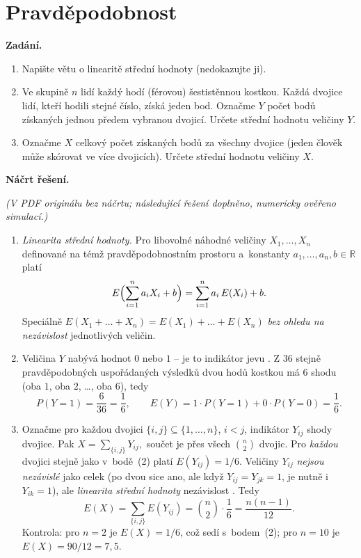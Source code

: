 \section{Pravděpodobnost}

\noindent\textbf{Zadání.}\par
\begin{enumerate}
  \item Napište větu o linearitě střední hodnoty (nedokazujte ji).
  \item Ve skupině $n$ lidí každý hodí (férovou) šestistěnnou kostkou. Každá dvojice lidí,
    kteří hodili stejné číslo, získá jeden bod. Označme $Y$ počet bodů získaných jednou
    předem vybranou dvojicí. Určete střední hodnotu veličiny $Y$.
  \item Označme $X$ celkový počet získaných bodů za všechny dvojice (jeden člověk může
    skórovat ve více dvojicích). Určete střední hodnotu veličiny $X$.
\end{enumerate}

\medskip
\noindent\textbf{Náčrt řešení.}\par
\textit{(V PDF originálu bez náčrtu; následující řešení doplněno, numericky ověřeno simulací.)}

\begin{enumerate}
  \item \emph{Linearita střední hodnoty.} Pro libovolné náhodné veličiny $X_1,\dots,X_n$ definované na témž pravděpodobnostním prostoru a~konstanty $a_1,\dots,a_n,b\in\mathbb{R}$ platí
    \[
      E\Bigl(\sum_{i=1}^{n} a_i X_i + b\Bigr) = \sum_{i=1}^{n} a_i\, E(X_i) + b.
    \]
    Speciálně $E(X_1+\dots+X_n)=E(X_1)+\dots+E(X_n)$ \emph{bez ohledu na nezávislost} jednotlivých veličin.

  \item Veličina $Y$ nabývá hodnot $0$ nebo $1$ -- je to indikátor jevu . Z $36$ stejně pravděpodobných uspořádaných výsledků dvou hodů kostkou má $6$ shodu (oba $1$, oba $2$, \dots, oba $6$), tedy
    \[
      P(Y=1)=\frac{6}{36}=\frac{1}{6},\qquad E(Y)=1\cdot P(Y=1)+0\cdot P(Y=0)=\boxed{\frac{1}{6}}.
    \]

  \item Označme pro každou dvojici $\{i,j\}\subseteq\{1,\dots,n\}$, $i<j$, indikátor $Y_{ij}$ shody dvojice. Pak
    \(
      X = \sum_{\{i,j\}} Y_{ij},
    \)
    součet je přes všech $\binom{n}{2}$ dvojic. Pro \emph{každou} dvojici stejně jako v~bodě~(2) platí $E(Y_{ij})=1/6$. Veličiny $Y_{ij}$ \emph{nejsou nezávislé} jako celek (po dvou sice ano, ale když $Y_{ij}=Y_{jk}=1$, je nutně i $Y_{ik}=1$), ale \emph{linearita střední hodnoty} nezávislost . Tedy
    \[
      E(X)=\sum_{\{i,j\}} E(Y_{ij})=\binom{n}{2}\cdot\frac{1}{6}=\boxed{\frac{n(n-1)}{12}}.
    \]
    Kontrola: pro $n=2$ je $E(X)=1/6$, což sedí s~bodem~(2); pro $n=10$ je $E(X)=90/12=7{,}5$.
\end{enumerate}
